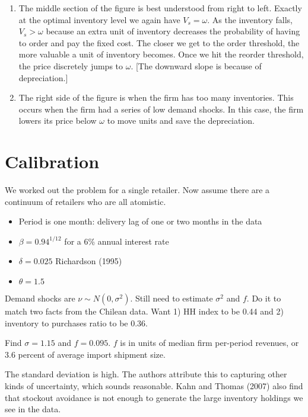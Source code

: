 \documentclass[11pt, pdftex]{article}
\begin{document}
\begin{enumerate}
\begin{enumerate}
          \item The middle section of the figure is best understood from right to left. Exactly at the optimal inventory level we again have $V_s=\omega$. As the inventory falls, $V_s>\omega$ because an extra unit of inventory decreases the probability of having to order and pay the fixed cost. The closer we get to the order threshold, the more valuable a unit of inventory becomes. Once we hit the reorder threshold, the price discretely jumps to $\omega$. [The downward slope is because of depreciation.]

          \item The right side of the figure is when the firm has too many inventories. This occurs when the firm had a series of low demand shocks. In this case, the firm lowers its price below $\omega$ to move units and save the depreciation.
        \end{enumerate}
\end{enumerate}

\section{Calibration}
We worked out the problem for a single retailer. Now assume there are a continuum of retailers who are all atomistic.

\begin{itemize}
  \item Period is one month: delivery lag of one or two months in the data
  \item $\beta=0.94^{1/12}$ for a 6\% annual interest rate
  \item $\delta=0.025$ Richardson (1995)
  \item $\theta=1.5$
\end{itemize}

Demand shocks are $\nu \sim N(0,\sigma^2)$. Still need to estimate $\sigma^2$ and $f$. Do it to match two facts from the Chilean data. Want 1) HH index to be 0.44 and 2) inventory to purchases ratio to be 0.36.

Find $\sigma=1.15$ and $f=0.095$. $f$ is in units of median firm per-period revenues, or 3.6 percent of average import shipment size.

The standard deviation is high. The authors attribute this to capturing other kinds of uncertainty, which sounds reasonable. Kahn and Thomas (2007) also find that stockout avoidance is not enough to generate the large inventory holdings we see in the data.
\end{document}
